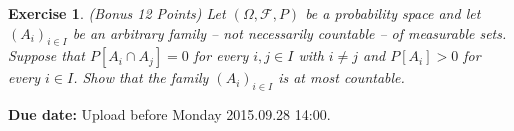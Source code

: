 \documentclass[DIV=classic,a4paper,10pt]{scrartcl}
\newtheorem{exercise}[theorem]{Exercise}
\theoremstyle{nonumberplain}
\numberwithin{equation}{section}
\begin{document}
\begin{exercise} (Bonus 12 Points) \newline
    Let $(\Omega,\mathcal{F},P)$ be a probability space and let $(A_i)_{i\in I}$ be an arbitrary family -- not necessarily countable -- of measurable sets.
    Suppose that $P[A_i\cap A_j]=0$ for every $i,j\in I$ with $i\neq j$ and $P[A_i]>0$ for every $i\in I$.
    Show that the family $(A_i)_{i\in I}$ is at most countable.
\end{exercise}

\smallskip
\noindent
\textbf{Due date:} Upload before Monday 2015.09.28 14:00.
\end{document}
